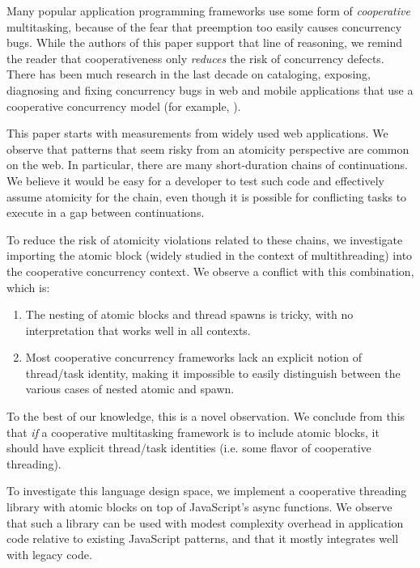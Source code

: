 \documentclass[sigplan,10pt,review,anonymous]{acmart}\settopmatter{printfolios=true,printccs=false,printacmref=false}
\begin{document}
Many popular application programming frameworks use some form of \emph{cooperative} multitasking, because of the fear that preemption too easily causes concurrency bugs.
While the authors of this paper support that line of reasoning, we remind the reader that cooperativeness only \emph{reduces} the risk of concurrency defects.
There has been much research in the last decade on cataloging, exposing, diagnosing and fixing concurrency bugs in web and mobile applications that use a cooperative concurrency model (for example, \cite{Hsiao2014, Petrov2012, Mutlu2015}).

This paper starts with measurements from widely used web applications\footnotemark{}.
We observe that patterns that seem risky from an atomicity perspective are common on the web.
In particular, there are many short-duration chains of continuations.
We believe it would be easy for a developer to test such code and effectively assume atomicity for the chain, even though it is possible for conflicting tasks to execute in a gap between continuations.


To reduce the risk of atomicity violations related to these chains, we investigate importing the atomic block (widely studied in the context of multithreading) into the cooperative concurrency context.
We observe a conflict with this combination, which is:
\begin{enumerate}
\item The nesting of atomic blocks and thread spawns is tricky, with no interpretation that works well in all contexts.
\item Most cooperative concurrency frameworks lack an explicit notion of thread/task identity, making it impossible to easily distinguish between the various cases of nested atomic and spawn.
\end{enumerate}
To the best of our knowledge, this is a novel observation.
We conclude from this that \emph{if} a cooperative multitasking framework is to include atomic blocks, it should have explicit thread/task identities (i.e. some flavor of cooperative threading).

To investigate this language design space, we implement a cooperative threading library with atomic blocks on top of JavaScript's async functions.
We observe that such a library can be used with modest complexity overhead in application code relative to existing JavaScript patterns, and that it mostly integrates well with legacy code.
\end{document}
